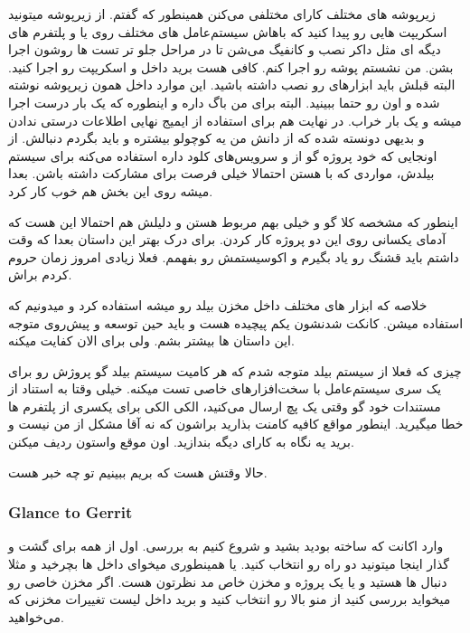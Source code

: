 زیرپوشه های مختلف کارای مختلفی می‌کنن همینطور که گفتم. از زیرپوشه  میتونید اسکریپت هایی رو پیدا کنید که باهاش سیستم‌عامل های مختلف
روی  یا  و پلتفرم های دیگه ای مثل داکر نصب و کانفیگ می‌شن تا در مراحل جلو تر تست ها روشون اجرا بشن.
من نشستم پوشه  رو اجرا کنم. کافی هست برید داخل  و اسکریپت  رو اجرا کنید. البته قبلش باید ابزارهای  رو نصب داشته باشید. این موارد داخل  همون زیرپوشه نوشته شده و اون رو حتما ببینید. البته برای من باگ داره و اینطوره که یک بار
درست اجرا میشه و یک بار خراب. در نهایت هم برای استفاده از ایمیج نهایی اطلاعات درستی ندادن و بدیهی دونسته شده که از دانش من یه کوچولو بیشتره و باید
بگردم دنبالش. از اونجایی که خود پروژه گو از  و سرویس‌های کلود داره استفاده می‌کنه برای سیستم بیلدش، مواردی که با  هستن احتمالا
خیلی فرصت برای مشارکت داشته باشن. بعدا میشه روی این بخش هم خوب کار کرد.

اینطور که مشخصه کلا گو و  خیلی بهم مربوط هستن و دلیلش هم احتمالا این هست که آدمای یکسانی روی این دو پروژه کار کردن.
برای درک بهتر این داستان بعدا که وقت داشتم باید قشنگ  رو یاد بگیرم و اکوسیستمش رو بفهمم. فعلا زیادی امروز زمان حروم کردم براش.

خلاصه که ابزار های مختلف داخل مخزن بیلد رو میشه استفاده کرد و میدونیم که استفاده میشن. کانکت شدنشون یکم پیچیده هست و باید حین
توسعه و پیش‌روی متوجه این داستان ها بیشتر بشم. ولی برای الان کفایت میکنه.

چیزی که فعلا از سیستم بیلد متوجه شدم که هر کامیت سیستم بیلد گو پروژش رو برای یک سری سیستم‌عامل با سخت‌افزارهای خاصی تست میکنه.
خیلی وقتا به استناد از مستندات خود گو وقتی یک پچ ارسال می‌کنید،‌ الکی الکی برای یکسری از پلتفرم ها خطا میگیرید. اینطور مواقع کافیه کامنت بذارید براشون
که نه آقا مشکل از من نیست و برید یه نگاه به کارای دیگه بندازید. اون موقع واستون ردیف میکنن.

حالا وقتش هست که بریم ببینیم تو  چه خبر هست.

\subsubsection{Glance to Gerrit}
وارد اکانت 
که ساخته بودید بشید و شروع کنیم به بررسی. اول از همه برای گشت و گذار اینجا میتونید دو راه رو انتخاب کنید.
یا همینطوری میخوای داخل \cl ها بچرخید و مثلا دنبال  ها هستید و یا یک پروژه و مخزن خاص مد نظرتون هست.
اگر مخزن خاصی رو میخواید بررسی کنید از منو بالا  رو انتخاب کنید و برید داخل لیست تغییرات مخزنی که می‌خواهید.

